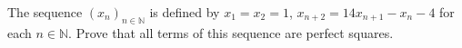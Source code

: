 The sequence $(x_n)_{n\in\mathbb N}$ is defined by $x_1=x_2=1$, $x_{n+2}=14x_{n+1}-x_n-4$ for each $n\in\mathbb N$. Prove that all terms of this sequence are perfect squares.
